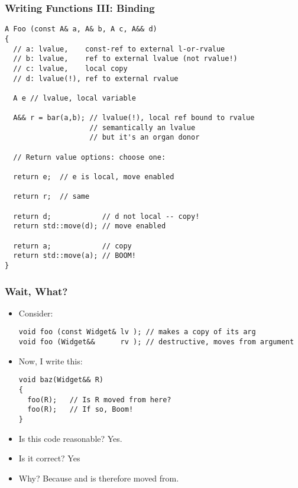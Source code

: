 \begin{frame}[fragile]
\frametitle{Writing Functions III: Binding}
{\scriptsize
\begin{verbatim}
A Foo (const A& a, A& b, A c, A&& d)
{
  // a: lvalue,    const-ref to external l-or-rvalue
  // b: lvalue,    ref to external lvalue (not rvalue!)
  // c: lvalue,    local copy
  // d: lvalue(!), ref to external rvalue

  A e // lvalue, local variable

  A&& r = bar(a,b); // lvalue(!), local ref bound to rvalue
                    // semantically an lvalue
                    // but it's an organ donor

  // Return value options: choose one:

  return e;  // e is local, move enabled

  return r;  // same
  
  return d;            // d not local -- copy!
  return std::move(d); // move enabled

  return a;            // copy
  return std::move(a); // BOOM!
}
\end{verbatim}
}

\end{frame}



\begin{frame}[fragile]
\frametitle{Wait, What?}
\begin{itemize}
\item {}  Consider:
{\scriptsize
\begin{verbatim}
void foo (const Widget& lv ); // makes a copy of its arg
void foo (Widget&&      rv ); // destructive, moves from argument
\end{verbatim} }
\pause
\vskip 6pt
\item Now, I write this:
{\scriptsize
\begin{verbatim}
void baz(Widget&& R) 
{
  foo(R);   // Is R moved from here?
  foo(R);   // If so, Boom!
}
\end{verbatim}
}
\vskip 6pt
\pause
\item Is this code reasonable?  Yes.
\pause
\item Is it correct? Yes
\pause
\item Why?  Because  and is
therefore  moved from.

\end{itemize}

\end{frame}


